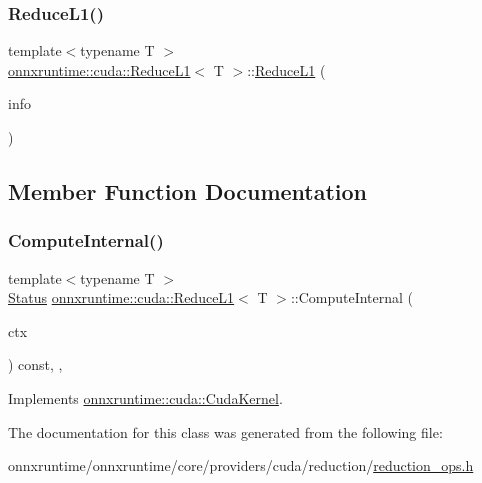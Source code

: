 \subsubsection{\texorpdfstring{Reduce\+L1()}{ReduceL1()}}
{\footnotesize\ttfamily template$<$typename T $>$ \\
\mbox{\hyperlink{classonnxruntime_1_1cuda_1_1ReduceL1}{onnxruntime\+::cuda\+::\+Reduce\+L1}}$<$ T $>$\+::\mbox{\hyperlink{classonnxruntime_1_1cuda_1_1ReduceL1}{Reduce\+L1}} (\begin{DoxyParamCaption}\item[{const \mbox{\hyperlink{classonnxruntime_1_1OpKernelInfo}{Op\+Kernel\+Info}} \&}]{info }\end{DoxyParamCaption})\hspace{0.3cm}{\ttfamily [inline]}}



\subsection{Member Function Documentation}
\mbox{\label{classonnxruntime_1_1cuda_1_1ReduceL1_ad0f25c4efdb6681cec851e6415498150}} 
\subsubsection{\texorpdfstring{Compute\+Internal()}{ComputeInternal()}}
{\footnotesize\ttfamily template$<$typename T $>$ \\
\mbox{\hyperlink{classonnxruntime_1_1common_1_1Status}{Status}} \mbox{\hyperlink{classonnxruntime_1_1cuda_1_1ReduceL1}{onnxruntime\+::cuda\+::\+Reduce\+L1}}$<$ T $>$\+::Compute\+Internal (\begin{DoxyParamCaption}\item[{\mbox{\hyperlink{classonnxruntime_1_1OpKernelContext}{Op\+Kernel\+Context}} $\ast$}]{ctx }\end{DoxyParamCaption}) const\hspace{0.3cm}{\ttfamily [inline]}, {\ttfamily [override]}, {\ttfamily [virtual]}}



Implements \mbox{\hyperlink{classonnxruntime_1_1cuda_1_1CudaKernel_aca7af04ae448017d6023d30bba231ebb}{onnxruntime\+::cuda\+::\+Cuda\+Kernel}}.



The documentation for this class was generated from the following file\+:\begin{DoxyCompactItemize}
\item 
onnxruntime/onnxruntime/core/providers/cuda/reduction/\mbox{\hyperlink{cuda_2reduction_2reduction__ops_8h}{reduction\+\_\+ops.\+h}}\end{DoxyCompactItemize}
